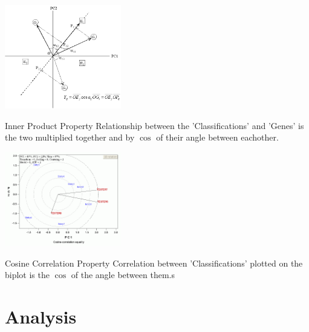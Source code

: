 \documentclass[serif]{beamer}
\begin{document}
\begin{frame}[t]
		{
			\begin{center}
				\includegraphics[width=2.0in]{images/inner_product_property_biplot}
			\end{center}
			
			\begin{block}{Inner Product Property}
				Relationship between the 'Classifications' and 'Genes' is the two
				multiplied together and by $\cos$ of their angle between eachother.
			\end{block}
		}
		
		{
			\begin{center}
				\includegraphics[width=2.0in]{images/cosine_correlation_property_biplot}	
			\end{center}
			
			\begin{block}{Cosine Correlation Property}
						Correlation between 'Classifications' plotted on the biplot is the $\cos$ of the angle between them.s
			\end{block}
			
		}
		
	\end{frame}
	
	
	\section{Analysis}
	
\end{document}
